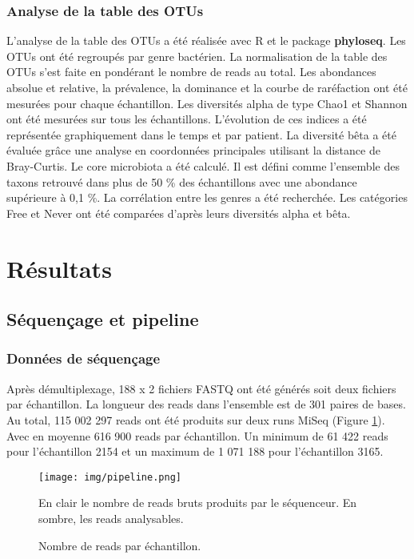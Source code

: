 \documentclass[12pt,a4paper]{article}
\begin{document}
\subsubsection{Analyse de la table des OTUs}
L’analyse de la table des OTUs a été réalisée avec R et le package \textbf{phyloseq}\cite{McMurdie2013}. Les OTUs ont été regroupés par genre bactérien. La normalisation de la table des OTUs s'est faite en pondérant le nombre de reads au total.
Les abondances absolue et relative, la prévalence, la dominance et la courbe de raréfaction ont été mesurées pour chaque échantillon.
Les diversités alpha de type Chao1 et Shannon ont été mesurées sur tous les échantillons. L'évolution de ces indices a été représentée graphiquement dans le temps et par patient.
La diversité bêta a été évaluée grâce une analyse en coordonnées principales utilisant la distance de Bray-Curtis.
Le core microbiota\cite{VanderGast2011} a été calculé. Il est défini comme l’ensemble des taxons retrouvé dans plus de 50 \% des échantillons avec une abondance supérieure à 0,1 \%.
La corrélation entre les genres a été recherchée.
Les catégories Free et Never ont été comparées d’après leurs diversités alpha et bêta.

\newpage

\section{Résultats}
\subsection{Séquençage et pipeline}
\subsubsection{Données de séquençage}
Après démultiplexage, 188 x 2 fichiers FASTQ ont été générés soit deux fichiers par échantillon.
La longueur des reads dans l'ensemble est de 301 paires de bases.
Au total, 115 002 297 reads ont été produits sur deux runs MiSeq (Figure \ref{readcount}). Avec en moyenne 616 900 reads par échantillon. Un minimum de 61 422 reads pour l’échantillon 2154 et un maximum de 1 071 188 pour l’échantillon 3165.


\begin{figure}[H]
\begin{center}
\texttt{[image: img/pipeline.png]}\hfill
\caption{Nombre de reads par échantillon.}
En clair le nombre de reads bruts produits par le séquenceur. En sombre, les reads analysables.
\label{readcount}

\end{center}
\end{figure}
\end{document}
